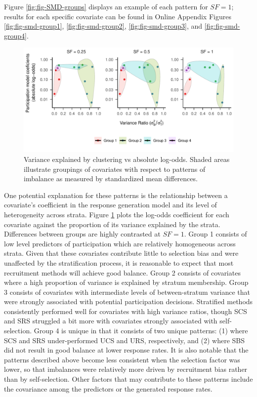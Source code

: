 \documentclass[
  english,
  man,floatsintext]{apa6}
\begin{document}
Figure \ref{fig:fig-SMD-groups} displays an example of each pattern for \(SF = 1\); results for each specific covariate can be found in Online Appendix Figures \ref{fig:fig-smd-group1}, \ref{fig:fig-smd-group2}, \ref{fig:fig-smd-group3}, and \ref{fig:fig-smd-group4}.



\begin{figure}
\centering
\includegraphics{6---Paper_files/figure-latex/fig-Var-Coef-1.pdf}
\caption{\label{fig:fig-Var-Coef}Variance explained by clustering vs absolute log-odds. Shaded areas illustrate groupings of covariates with respect to patterns of imbalance as measured by standardized mean differences.}
\end{figure}

One potential explanation for these patterns is the relationship between a covariate's coefficient in the response generation model and its level of heterogeneity across strata.
Figure \ref{fig:fig-Var-Coef} plots the log-odds coefficient for each covariate against the proportion of its variance explained by the strata.
Differences between groups are highly contrasted at \(SF = 1\). Group 1 consists of low level predictors of participation which are relatively homogeneous across strata. Given that these covariates contribute little to selection bias and were unaffected by the stratification process, it is reasonable to expect that most recruitment methods will achieve good balance.
Group 2 consists of covariates where a high proportion of variance is explained by stratum membership. Group 3 consists of covariates with intermediate levels of between-stratum variance that were strongly associated with potential participation decisions. Stratified methods consistently performed well for covariates with high variance ratios, though SCS and SRS struggled a bit more with covariates strongly associated with self-selection.
Group 4 is unique in that it consists of two unique patterns: (1) where SCS and SRS under-performed UCS and URS, respectively, and (2) where SBS did not result in good balance at lower response rates. It is also notable that the patterns described above become less consistent when the selection factor was lower, so that imbalances were relatively more driven by recruitment bias rather than by self-selection. Other factors that may contribute to these patterns include the covariance among the predictors or the generated response rates.
\end{document}
